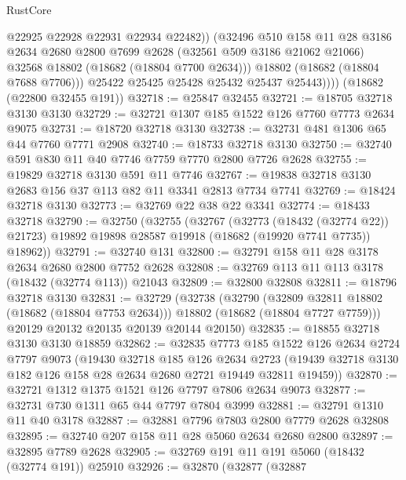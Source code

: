 \begin{lexlean}{RustCore}
\begin{coremodule}
                  @22925
                  @22928
                  @22931
                  @22934
                  @22482))
              (@32496
                @510
                @158
                @11
                @28
                @3186
                @2634
                @2680
                @2800
                @7699
                @2628
                (@32561 @509 @3186 @21062 @21066)
                @32568
                @18802
                (@18682 (@18804 @7700 @2634)))
              @18802
              (@18682 (@18804 @7688 @7706)))
            @25422
            @25425
            @25428
            @25432
            @25437
            @25443))))
    (@18682 (@22800 @32455 @191))
@32718 := @25847 @32455
@32721 := @18705 @32718 @3130 @3130
@32729 := @32721 @1307 @185 @1522 @126 @7760 @7773 @2634 @9075
@32731 := @18720 @32718 @3130
@32738 := @32731 @481 @1306 @65 @44 @7760 @7771 @2908
@32740 := @18733 @32718 @3130
@32750 := @32740 @591 @830 @11 @40 @7746 @7759 @7770 @2800 @7726 @2628
@32755 := @19829 @32718 @3130 @591 @11 @7746
@32767 := @19838 @32718 @3130 @2683 @156 @37 @113 @82 @11 @3341 @2813 @7734 @7741
@32769 := @18424 @32718 @3130
@32773 := @32769 @22 @38 @22 @3341
@32774 := @18433 @32718
@32790 := @32750
    (@32755
      (@32767
        (@32773 (@18432 (@32774 @22)) @21723)
        @19892
        @19898
        @28587
        @19918
        (@18682 (@19920 @7741 @7735))
        @18962))
@32791 := @32740 @131
@32800 := @32791 @158 @11 @28 @3178 @2634 @2680 @2800 @7752 @2628
@32808 := @32769 @113 @11 @113 @3178 (@18432 (@32774 @113)) @21043
@32809 := @32800 @32808
@32811 := @18796 @32718 @3130
@32831 := @32729
    (@32738
      (@32790
        (@32809 @32811 @18802 (@18682 (@18804 @7753 @2634)))
        @18802
        (@18682 (@18804 @7727 @7759)))
      @20129
      @20132
      @20135
      @20139
      @20144
      @20150)
@32835 := @18855 @32718 @3130 @3130 @18859
@32862 := @32835
    @7773
    @185
    @1522
    @126
    @2634
    @2724
    @7797
    @9073
    (@19430
      @32718
      @185
      @126
      @2634
      @2723
      (@19439 @32718 @3130 @182 @126 @158 @28 @2634 @2680 @2721 @19449 @32811 @19459))
@32870 := @32721 @1312 @1375 @1521 @126 @7797 @7806 @2634 @9073
@32877 := @32731 @730 @1311 @65 @44 @7797 @7804 @3999
@32881 := @32791 @1310 @11 @40 @3178
@32887 := @32881 @7796 @7803 @2800 @7779 @2628 @32808
@32895 := @32740 @207 @158 @11 @28 @5060 @2634 @2680 @2800
@32897 := @32895 @7789 @2628
@32905 := @32769 @191 @11 @191 @5060 (@18432 (@32774 @191)) @25910
@32926 := @32870
    (@32877
      (@32887

\end{coremodule}
\end{lexlean}
